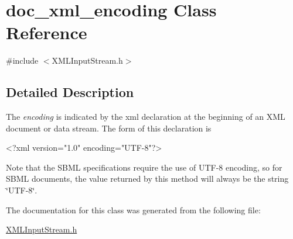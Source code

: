 \hypertarget{classdoc__xml__encoding}{}\section{doc\+\_\+xml\+\_\+encoding Class Reference}
\label{classdoc__xml__encoding}


{\ttfamily \#include $<$X\+M\+L\+Input\+Stream.\+h$>$}



\subsection{Detailed Description}
\begin{DoxyParagraph}{The {\itshape encoding} is indicated by the xml declaration at the}
beginning of an X\+ML document or data stream. The form of this declaration is \begin{DoxyVerb}<?xml version="1.0" encoding="UTF-8"?>
\end{DoxyVerb}
 Note that the S\+B\+ML specifications require the use of U\+T\+F-\/8 encoding, so for S\+B\+ML documents, the value returned by this method will always be the string {\ttfamily \char`\"{}\+U\+T\+F-\/8\char`\"{}}. 
\end{DoxyParagraph}


The documentation for this class was generated from the following file\+:\begin{DoxyCompactItemize}
\item 
\hyperlink{_x_m_l_input_stream_8h}{X\+M\+L\+Input\+Stream.\+h}\end{DoxyCompactItemize}
